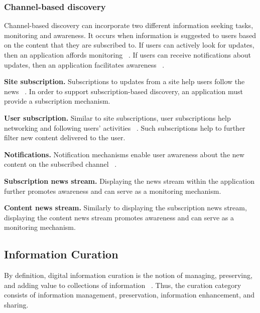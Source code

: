 \documentclass{casconpaper}
\begin{document}
{\subsubsection{Channel-based discovery}
Channel-based discovery can incorporate two different information seeking tasks, monitoring and awareness. It occurs when information is suggested to users based on the content that they are subscribed to. If users can actively look for updates, then an application affords monitoring ~\cite{morrison}. If users can receive notifications about updates, then an application facilitates awareness ~\cite{bates2002, bates1986}.                            


\textbf{Site subscription.} Subscriptions to updates from a site help users follow the news ~\cite{java}. In order to support subscription-based discovery, an application must provide a subscription mechanism.

\textbf{User subscription.} Similar to site subscriptions, user subscriptions help networking and following users' activities ~\cite{millen}. Such subscriptions help to further filter new content delivered to the user.

\textbf{Notifications.} Notification mechanisms enable user awareness about the  new content on the subscribed channel ~\cite{millen}. 

\textbf{Subscription news stream.} Displaying the news stream within the application further promotes awareness and can serve as a monitoring mechanism.

\textbf{Content news stream.} Similarly to displaying the subscription news stream, displaying the content news stream promotes awareness and can serve as a monitoring mechanism.

} %

{\subsection{Information Curation}
By definition, digital information curation is the notion of managing, preserving, and adding value to collections of information ~\cite{beagrie, wittaker}. Thus, the curation category consists of information management, preservation, information enhancement, and sharing.  
} %
\end{document}
